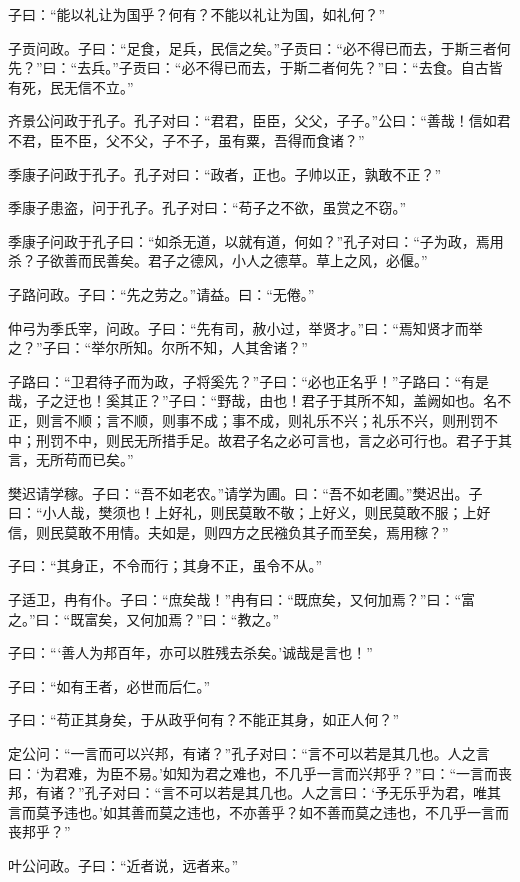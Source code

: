 \documentclass[a5paper]{ctexbook}
\begin{document}
    子曰：“能以礼让为国乎？何有？不能以礼让为国，如礼何？”

    子贡问政。子曰：“足食，足兵，民信之矣。”子贡曰：“必不得已而去，于斯三者何先？”曰：“去兵。”子贡曰：“必不得已而去，于斯二者何先？”曰：“去食。自古皆有死，民无信不立。”

    齐景公问政于孔子。孔子对曰：“君君，臣臣，父父，子子。”公曰：“善哉！信如君不君，臣不臣，父不父，子不子，虽有粟，吾得而食诸？”

    季康子问政于孔子。孔子对曰：“政者，正也。子帅以正，孰敢不正？”

    季康子患盗，问于孔子。孔子对曰：“苟子之不欲，虽赏之不窃。”

    季康子问政于孔子曰：“如杀无道，以就有道，何如？”孔子对曰：“子为政，焉用杀？子欲善而民善矣。君子之德风，小人之德草。草上之风，必偃。”

    子路问政。子曰：“先之劳之。”请益。曰：“无倦。”

    仲弓为季氏宰，问政。子曰：“先有司，赦小过，举贤才。”曰：“焉知贤才而举之？”子曰：“举尔所知。尔所不知，人其舍诸？”

    子路曰：“卫君待子而为政，子将奚先？”子曰：“必也正名乎！”子路曰：“有是哉，子之迂也！奚其正？”子曰：“野哉，由也！君子于其所不知，盖阙如也。名不正，则言不顺；言不顺，则事不成；事不成，则礼乐不兴；礼乐不兴，则刑罚不中；刑罚不中，则民无所措手足。故君子名之必可言也，言之必可行也。君子于其言，无所苟而已矣。”

    樊迟请学稼。子曰：“吾不如老农。”请学为圃。曰：“吾不如老圃。”樊迟出。子曰：“小人哉，樊须也！上好礼，则民莫敢不敬；上好义，则民莫敢不服；上好信，则民莫敢不用情。夫如是，则四方之民襁负其子而至矣，焉用稼？”

    子曰：“其身正，不令而行；其身不正，虽令不从。”

    子适卫，冉有仆。子曰：“庶矣哉！”冉有曰：“既庶矣，又何加焉？”曰：“富之。”曰：“既富矣，又何加焉？”曰：“教之。”

    子曰：“‘善人为邦百年，亦可以胜残去杀矣。’诚哉是言也！”

    子曰：“如有王者，必世而后仁。”

    子曰：“苟正其身矣，于从政乎何有？不能正其身，如正人何？”

    定公问：“一言而可以兴邦，有诸？”孔子对曰：“言不可以若是其几也。人之言曰：‘为君难，为臣不易。’如知为君之难也，不几乎一言而兴邦乎？”曰：“一言而丧邦，有诸？”孔子对曰：“言不可以若是其几也。人之言曰：‘予无乐乎为君，唯其言而莫予违也。’如其善而莫之违也，不亦善乎？如不善而莫之违也，不几乎一言而丧邦乎？”

    叶公问政。子曰：“近者说，远者来。”
\end{document}
